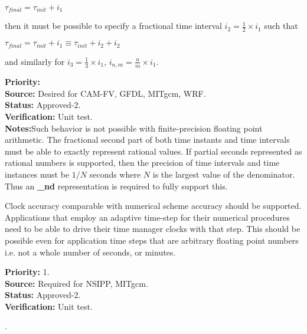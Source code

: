$\tau_{final}=\tau_{init}+i_1 $

then it must be possible to specify a fractional time 
interval $i_{2} = \frac{1}{2}\times i_{1}$ such that

$\tau_{final}=\tau_{init}+i_1\equiv\tau_{init}+i_2+i_2 $

and similarly for $i_{3} = \frac{1}{3}\times i_{1}$, $i_{n,m} = \frac{n}{m}\times i_{1}$.
\begin{reqlist}
{\bf Priority:} \\
{\bf Source:} Desired for CAM-FV, GFDL, MITgcm, WRF. \\
{\bf Status:} Approved-2. \\
{\bf Verification:} Unit test. \\  
{\bf Notes:}Such behavior is not possible with finite-precision floating
point arithmetic.  The fractional second part of both time instants and
time intervals must be able to exactly represent rational values.  If
partial seconds represented as rational numbers is supported, then the
precision of time intervals and time instances must be $1/N$ seconds where
$N$ is the largest value of the denominator.  Thus an {\bf \_nd} representation
is required to fully support this.
\end{reqlist}

Clock accuracy comparable with numerical scheme accuracy should be supported.
Applications that employ an adaptive time-step for their numerical
procedures need to be able to drive their time manager clocks with that step.
This should be possible even for application time steps that are arbitrary 
floating point numbers i.e. not a whole number of seconds, or minutes.
\begin{reqlist}
{\bf Priority:} 1. \\
{\bf Source:} Required for NSIPP, MITgcm. \\
{\bf Status:} Approved-2. \\
{\bf Verification:} Unit test. 
\end{reqlist}

\label{req:sharing}.


